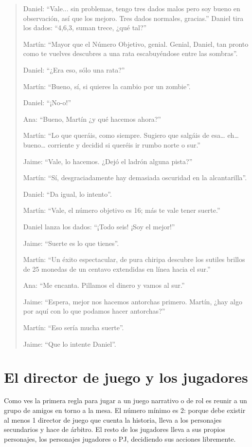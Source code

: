 \begin{quotation}
Daniel: \enquote{Vale... sin problemas, tengo tres dados malos pero soy bueno en observación, así que los mejoro. Tres dados normales, gracias.} Daniel tira los dados: \enquote{4,6,3, suman trece, ¿qué tal?}

Martín: \enquote{Mayor que el Número Objetivo, genial. Genial, Daniel, tan pronto como te vuelves descubres a una rata escabuyéndose entre las sombras}.

Daniel: \enquote{¿Era eso, sólo una rata?}

Martín: \enquote{Bueno, sí, si quieres la cambio por un zombie}.

Daniel: \enquote{¡No-o!}

Ana: \enquote{Bueno, Martín ¿y qué hacemos ahora?}

Martín: \enquote{Lo que queráis, como siempre. Sugiero que salgáis de esa… eh… bueno… corriente y decidid si queréis ir rumbo norte o sur.}

Jaime: \enquote{Vale, lo hacemos. ¿Dejó el ladrón alguna pista?}

Martín: \enquote{Sí, desgraciadamente hay demasiada oscuridad en la alcantarilla}.

Daniel: \enquote{Da igual, lo intento}.

Martín: \enquote{Vale, el número objetivo es 16; más te vale tener suerte.}

Daniel lanza los dados: \enquote{¡Todo seis! ¡Soy el mejor!}

Jaime: \enquote{Suerte es lo que tienes}.

Martín: \enquote{Un éxito espectacular, de pura chiripa descubre los sutiles brillos de 25 monedas de un centavo extendidas en línea hacia el sur.}

Ana: \enquote{Me encanta. Pillamos el dinero y vamos al sur.}

Jaime: \enquote{Espera, mejor nos hacemos antorchas primero. Martín, ¿hay algo por aquí con lo que podamos hacer antorchas?}

Martín: \enquote{Eso sería mucha suerte}.

Jaime: \enquote{Que lo intente Daniel}.

\end{quotation}

\section{El director de juego y los jugadores}

Como ves la primera regla para jugar a un juego narrativo o de rol es reunir a un grupo de amigos en torno a la mesa. El número mínimo es 2: porque debe existir al menos 1 director de juego que cuenta la historia, lleva a los personajes secundarios y hace de árbitro. El resto de los jugadores lleva a sus propios personajes, los personajes jugadores o PJ, decidiendo sus acciones libremente.

